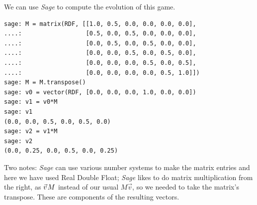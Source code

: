 We can use \textit{Sage} to compute the evolution of this game. 
\begin{lstlisting}
sage: M = matrix(RDF, [[1.0, 0.5, 0.0, 0.0, 0.0, 0.0],
....:                  [0.5, 0.0, 0.5, 0.0, 0.0, 0.0],
....:                  [0.0, 0.5, 0.0, 0.5, 0.0, 0.0],
....:                  [0.0, 0.0, 0.5, 0.0, 0.5, 0.0],
....:                  [0.0, 0.0, 0.0, 0.5, 0.0, 0.5],
....:                  [0.0, 0.0, 0.0, 0.0, 0.5, 1.0]])
sage: M = M.transpose()
sage: v0 = vector(RDF, [0.0, 0.0, 0.0, 1.0, 0.0, 0.0])
sage: v1 = v0*M
sage: v1
(0.0, 0.0, 0.5, 0.0, 0.5, 0.0)
sage: v2 = v1*M
sage: v2
(0.0, 0.25, 0.0, 0.5, 0.0, 0.25)  
\end{lstlisting}
Two notes: \textit{Sage} can use various number systems to 
make the matrix entries and here we have used Real Double Float; 
\textit{Sage} likes to do matrix multiplication from the right, 
as $\vec{v}\hspace{.1em}M$ instead of our usual $M\vec{v}$, 
so we needed to take the matrix's transpose.
These are components of the resulting vectors.

